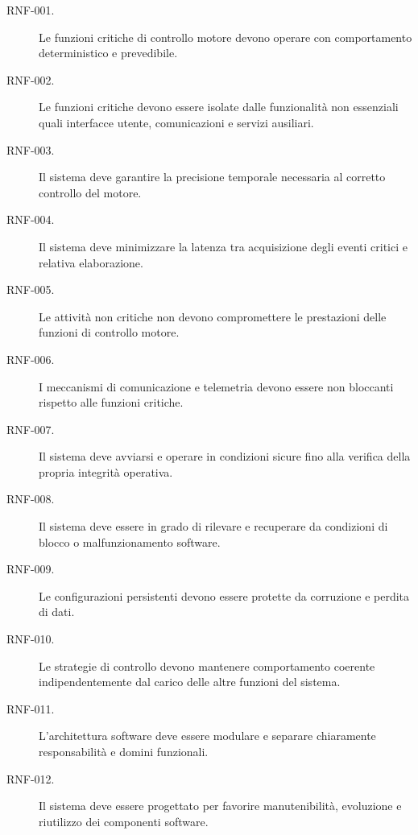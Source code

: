 \documentclass{article}
\begin{document}
\begin{description}
    \item[RNF-001.] Le funzioni critiche di controllo motore devono operare con
          comportamento deterministico e prevedibile.

    \item[RNF-002.] Le funzioni critiche devono essere isolate dalle
          funzionalità non essenziali quali interfacce utente, comunicazioni e
          servizi ausiliari.

    \item[RNF-003.] Il sistema deve garantire la precisione temporale necessaria
          al corretto controllo del motore.

    \item[RNF-004.] Il sistema deve minimizzare la latenza tra acquisizione
          degli eventi critici e relativa elaborazione.

    \item[RNF-005.] Le attività non critiche non devono compromettere le
          prestazioni delle funzioni di controllo motore.

    \item[RNF-006.] I meccanismi di comunicazione e telemetria devono essere non
          bloccanti rispetto alle funzioni critiche.

    \item[RNF-007.] Il sistema deve avviarsi e operare in condizioni sicure fino
          alla verifica della propria integrità operativa.

    \item[RNF-008.] Il sistema deve essere in grado di rilevare e recuperare da
          condizioni di blocco o malfunzionamento software.

    \item[RNF-009.] Le configurazioni persistenti devono essere protette da
          corruzione e perdita di dati.

    \item[RNF-010.] Le strategie di controllo devono mantenere comportamento
          coerente indipendentemente dal carico delle altre funzioni del
          sistema.

    \item[RNF-011.] L'architettura software deve essere modulare e separare
          chiaramente responsabilità e domini funzionali.

    \item[RNF-012.] Il sistema deve essere progettato per favorire
          manutenibilità, evoluzione e riutilizzo dei componenti software.


\end{description}
\end{document}
